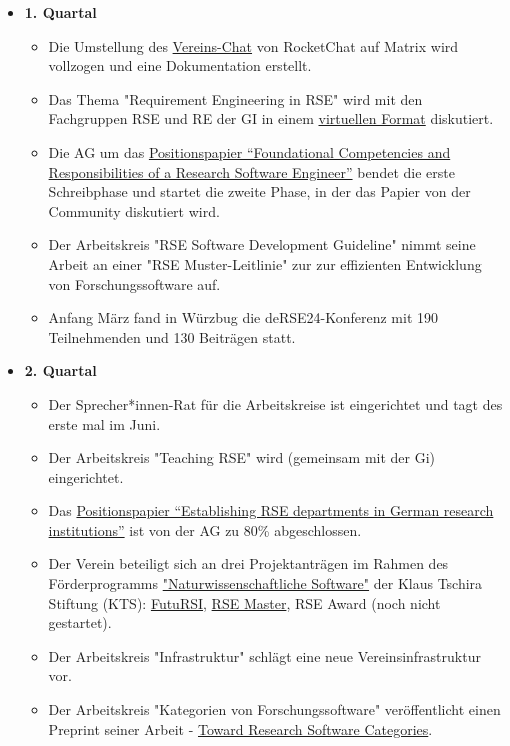 \begin{itemize}
 \item[] \textbf{1. Quartal}
   \begin{itemize}
     \item Die Umstellung des \href{https://de-rse.org/de/matrix.html}{Vereins-Chat} von RocketChat auf Matrix wird vollzogen und eine Dokumentation erstellt.
     \item Das Thema "Requirement Engineering in RSE" wird mit den Fachgruppen RSE und RE der GI in einem \href{https://fg-re.gi.de/veranstaltung/event-re-and-rse}{virtuellen Format} diskutiert.
     \item Die AG um das \href{https://doi.org/10.12688/f1000research.157778.2}{Positionspapier “Foundational Competencies and Responsibilities of a Research Software Engineer”} bendet die erste Schreibphase und startet die zweite Phase, in der das Papier von der Community diskutiert wird. 
     \item Der Arbeitskreis "RSE Software Development Guideline" nimmt seine Arbeit an einer "RSE Muster-Leitlinie" zur zur effizienten Entwicklung von Forschungssoftware auf.
     \item Anfang März fand in Würzbug die deRSE24-Konferenz mit 190 Teilnehmenden und 130 Beiträgen statt.
  
   \end{itemize}\clearpage
 \item[] \textbf{2. Quartal}
   \begin{itemize}
    \item Der Sprecher*innen-Rat für die Arbeitskreise ist eingerichtet und tagt des erste mal im Juni.
    \item Der Arbeitskreis "Teaching RSE" wird (gemeinsam mit der Gi) eingerichtet.
    \item Das \href{https://github.com/DE-RSE/2023_paper-RSE-groups}{Positionspapier “Establishing RSE departments in German research institutions”} ist von der AG zu 80\% abgeschlossen.
    \item Der Verein beteiligt sich an drei Projektanträgen im Rahmen des Förderprogramms \href{https://klaus-tschira-stiftung.de/foerderungen/naturwissenschaftliche-software/}{"Naturwissenschaftliche Software"} der Klaus Tschira Stiftung (KTS): \href{https://www.futursi.de/}{FutuRSI}, \href{https://the-teachingrse-project.github.io/RSE-Masters/}{RSE Master}, RSE Award (noch nicht gestartet).
    \item Der Arbeitskreis "Infrastruktur" schlägt eine neue Vereinsinfrastruktur vor.
    \item Der Arbeitskreis "Kategorien von Forschungssoftware" veröffentlicht einen Preprint seiner Arbeit - \href{https://arxiv.org/abs/2404.14364}{Toward Research Software Categories}.
     

\end{itemize}
\end{itemize}
